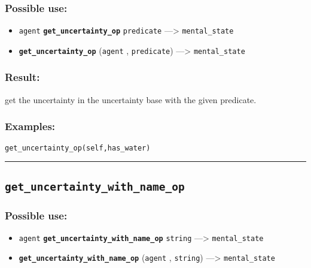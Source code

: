 \documentclass[]{book}
\providecommand{\tightlist}{%
  \setlength{\itemsep}{0pt}\setlength{\parskip}{0pt}}
\theoremstyle{definition}
\theoremstyle{definition}
\theoremstyle{definition}
\theoremstyle{remark}
\begin{document}
\subsubsection{Possible use:}\label{possible-use-234}

\begin{itemize}
\tightlist
\item
  \texttt{agent} \textbf{\texttt{get\_uncertainty\_op}}
  \texttt{predicate} ---\textgreater{} \texttt{mental\_state}
\item
  \textbf{\texttt{get\_uncertainty\_op}} (\texttt{agent} ,
  \texttt{predicate}) ---\textgreater{} \texttt{mental\_state}
\end{itemize}

\subsubsection{Result:}\label{result-226}

get the uncertainty in the uncertainty base with the given predicate.

\subsubsection{Examples:}\label{examples-179}

\begin{verbatim}
get_uncertainty_op(self,has_water) 
\end{verbatim}

\begin{center}\rule{0.5\linewidth}{\linethickness}\end{center}

\subsection{\texorpdfstring{\texttt{get\_uncertainty\_with\_name\_op}}{get\_uncertainty\_with\_name\_op}}\label{get_uncertainty_with_name_op}

\subsubsection{Possible use:}\label{possible-use-235}

\begin{itemize}
\tightlist
\item
  \texttt{agent} \textbf{\texttt{get\_uncertainty\_with\_name\_op}}
  \texttt{string} ---\textgreater{} \texttt{mental\_state}
\item
  \textbf{\texttt{get\_uncertainty\_with\_name\_op}} (\texttt{agent} ,
  \texttt{string}) ---\textgreater{} \texttt{mental\_state}
\end{itemize}
\end{document}
